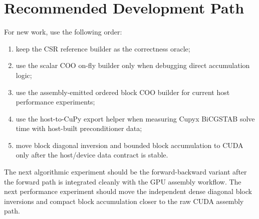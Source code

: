 \documentclass[11pt]{article}
\begin{document}
\section{Recommended Development Path}

For new work, use the following order:
\begin{enumerate}[nosep]
  \item keep the CSR reference builder as the correctness oracle;
  \item use the scalar COO on-fly builder only when debugging direct
        accumulation logic;
  \item use the assembly-emitted ordered block COO builder for current host
        performance experiments;
  \item use the host-to-CuPy export helper
         when measuring
        Cupyx BiCGSTAB solve time with host-built preconditioner data;
  \item move block diagonal inversion and bounded block accumulation to CUDA
        only after the host/device data contract is stable.
\end{enumerate}

The next algorithmic experiment should be the forward-backward variant after
the forward path is integrated cleanly with the GPU assembly workflow.  The
next performance experiment should move the independent dense diagonal block
inversions and compact block accumulation closer to the raw CUDA assembly path.
\end{document}

